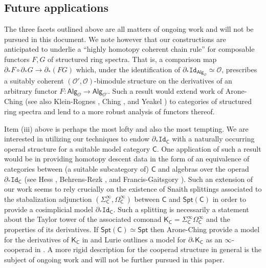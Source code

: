 \documentclass[11pt]{amsart}
\theoremstyle{definition}
\theoremstyle{remark}
\newcommand{\Spt}{\mathsf{Spt}}
\newcommand{\Sp}{\Sigma^{\infty}}
\newcommand{\U}{\Omega^{\infty}}
\newcommand{\Alg}[1]{ {\mathsf{Alg}_{\mathcal{#1}}} }
\newcommand{\Id}{\mathtt{Id}}
\newcommand{\Cal}[1]{\mathcal{#1}}
\begin{document}
\subsection{Future applications} The three facets outlined above are all matters of ongoing work and will not be pursued in this document. We note however that our constructions are anticipated to underlie a ``highly homotopy coherent chain rule'' for composable functors $F,G$ of structured ring spectra. That is, a comparison map $\partial_*F\circ \partial_*G\to \partial_*(FG)$ which, under the identification of $\partial_* \Id_{\Alg{O}}\simeq \Cal{O}$, prescribes a suitably coherent $(\Cal{O}',\Cal{O})$-bimodule structure on the derivatives of an arbitrary functor $F\colon \Alg{O}\to \Alg{O'}.$ Such a result would extend work of Arone-Ching \cite{AC-1} (see also Klein-Rognes \cite{Klein-Rog}, Ching \cite{Ching-chain-rule}, and Yeakel \cite{Yeak}) to categories of structured ring spectra and lend to a more robust analysis of functors thereof.

Item (iii) above is perhaps the most lofty and also the most tempting. We are interested in utilizing our techniques to endow $\partial_* \Id_{\mathsf{C}}$ with a naturally occurring operad structure for a suitable model category $\mathsf{C}$. One application of such a result would be in providing homotopy descent data in the form of an equivalence of categories between  (a suitable subcategory of) $\mathsf{C}$ and algebras over the operad $\partial_* \Id_{\mathsf{C}}$ (see Hess \cite{Hess}, Behrens-Rezk \cite{BR}, and Francis-Gaitsgory \cite{FG}). Such an extension of our work seems to rely crucially on the existence of Snaith splittings associated to the stabalization adjunction $(\Sp_{\mathsf{C}}, \U_{\mathsf{C}})$ between $\mathsf{C}$ and $\mathsf{Spt}(\mathsf{C})$ in order to provide a cosimplicial model $\partial_*\Id_{\mathsf{C}}$. Such a splitting is necessarily a statement about the Taylor tower of the associated comonad $\mathsf{K}_{\mathsf{C}}=\Sp_{\mathsf{C}}\U_{\mathsf{C}}$ and the properties of its derivatives. If $\Spt(\mathsf{C})\simeq \Spt$ then Arone-Ching provide a model for the derivatives of $\mathsf{K}_{\mathsf{C}}$ in \cite{AC-1} and Lurie outlines a model for $\partial_*\mathsf{K}_{\mathsf{C}}$ as an $\infty$-cooperad in \cite[ and ]{Lur}. A more rigid description for the cooperad structure in general is the subject of ongoing work and will not be further pursued in this paper.
\end{document}
